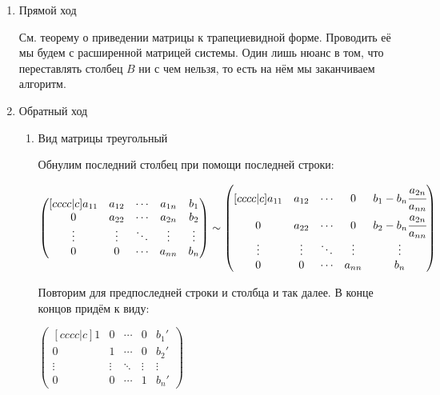 \begin{enumerate}
    \item Прямой ход

          См. теорему о приведении матрицы к трапециевидной форме. Проводить её мы будем с расширенной матрицей системы. Один лишь нюанс в том, что переставлять столбец \(B\) ни с чем нельзя, то есть на нём мы заканчиваем алгоритм.

    \item Обратный ход

          \begin{enumerate}
              \item Вид матрицы треугольный

                    Обнулим последний столбец при помощи последней строки:

                    \(
                    \begin{pmatrix}[cccc|c]
                        a_{11} & a_{12} & \cdots & a_{1n} & b_1    \\
                        0      & a_{22} & \cdots & a_{2n} & b_2    \\
                        \vdots & \vdots & \ddots & \vdots & \vdots \\
                        0      & 0      & \cdots & a_{nn} & b_n
                    \end{pmatrix} \sim
                    \begin{pmatrix}[cccc|c]
                        a_{11} & a_{12} & \cdots & 0      & b_1 - b_n \cfrac{a_{2n}}{a_{nn}} \\
                        0      & a_{22} & \cdots & 0      & b_2 - b_n \cfrac{a_{2n}}{a_{nn}} \\
                        \vdots & \vdots & \ddots & \vdots & \vdots                           \\
                        0      & 0      & \cdots & a_{nn} & b_n
                    \end{pmatrix}
                    \)

                    Повторим для предпоследней строки и столбца и так далее. В конце концов придём к виду:

                    \(
                    \begin{pmatrix}[cccc|c]
                        1      & 0      & \cdots & 0      & b_1'   \\
                        0      & 1      & \cdots & 0      & b_2'   \\
                        \vdots & \vdots & \ddots & \vdots & \vdots \\
                        0      & 0      & \cdots & 1      & b_n'
                    \end{pmatrix}
                    \)


\end{enumerate}
\end{enumerate}
